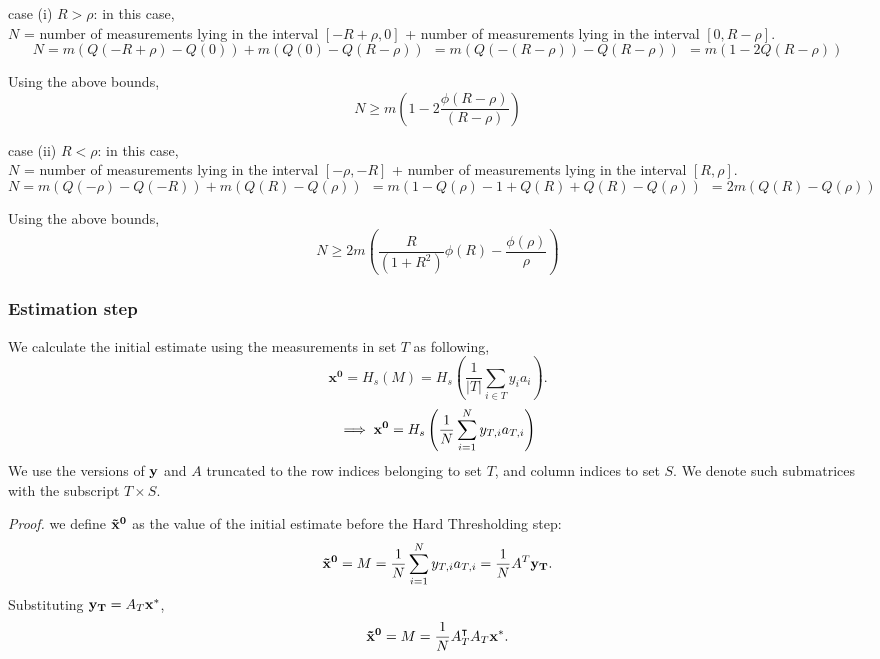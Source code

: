 case (i) $R > \rho$: in this case, \\
$N$ = number of measurements lying in the interval $[-R + \rho,0]$ + number of measurements lying in the interval $[0, R-\rho]$.
\begin{equation}
N = m\left(Q(-R+\rho)- Q(0)\right) + m\left(Q(0)- Q(R-\rho)\right)
~~ = m\left(Q(-(R-\rho))- Q(R-\rho)\right) 
~~ = m\left(1-2Q(R-\rho)\right)
\end{equation}

Using the above bounds,
$$
N \geq m \left(1-2\frac{\phi(R-\rho)}{(R-\rho)} \right)
$$

case (ii) $R < \rho$: in this case, \\
$N$ = number of measurements lying in the interval $[-\rho,-R]$ + number of measurements lying in the interval $[R,\rho]$.
\begin{equation}
N = m\left(Q(-\rho)- Q(-R)\right) + m\left(Q(R)- Q(\rho)\right)
~~ = m\left(1 - Q(\rho)-1 +Q(R) +Q(R) -Q(\rho)\right) 
~~ = 2m\left(Q(R)-Q(\rho)\right)
\end{equation}

Using the above bounds,
$$
N \geq 2m \left(\frac{R}{(1+R^2)} \phi(R) - \frac{\phi(\rho)}{\rho}\right)
$$


\subsubsection{Estimation step}

We calculate the initial estimate using the measurements in set $T$ as following,
$$
\mathbf{{x}^0} = H_s(M) = H_s\left(\frac{1}{|T|}\sum_{i\in T}y_{i}a_{i}\right).
$$
$$
\implies \mathbf{x^0} = H_s\left( \frac{1}{N}\sum_{i=1}^{N}y_{T,i}a_{T,i}\right)
$$
We use the versions of $\mathbf{y}$ and $A$ truncated to the row indices belonging to set $T$, and column indices to set $S$. We denote such submatrices with the subscript $T\times S$. 


\textit{Proof.} we define $\mathbf{\tilde{x}^0}$ as the value of the initial estimate before the Hard Thresholding step:
$$
\mathbf{\tilde{x}^0} = M = \frac{1}{N}\sum_{i=1}^{N}y_{T,i}a_{T,i} =  \frac{1}{N}A^T\mathbf{y_T}.
$$
Substituting $\mathbf{y_T}=A_T\mathbf{x^*}$,
$$
\mathbf{\tilde{x}^0} = M = \frac{1}{N}A_T^\intercal A_T\mathbf{x^*}.
$$

